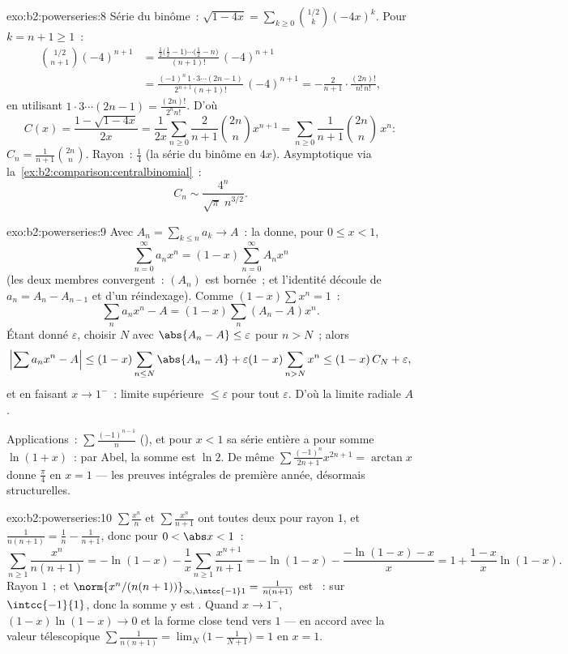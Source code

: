 \begin{solution}{exo:b2:powerseries:8}
Série du binôme~: $\sqrt{1-4x} = \sum_{k\geq0}
\binom{1/2}{k}(-4x)^k$. Pour $k = n + 1 \geq 1$~:
\begin{align*}
\binom{1/2}{n+1}(-4)^{n+1}
&= \frac{\frac12\bigl(\frac12 - 1\bigr)\cdots\bigl(\frac12 -
n\bigr)}{(n+1)!}\,(-4)^{n+1}\\
&= \frac{(-1)^n\,1\cdot3\cdots(2n-1)}{2^{n+1}(n+1)!}\,(-4)^{n+1}
= -\frac{2}{n+1}\cdot\frac{(2n)!}{n!\,n!} ,
\end{align*}
en utilisant $1\cdot3\cdots(2n-1) = \frac{(2n)!}{2^n n!}$. D'où
\[
C(x) = \frac{1 - \sqrt{1-4x}}{2x}
= \frac{1}{2x}\sum_{n\geq0}\frac{2}{n+1}\binom{2n}{n}x^{n+1}
= \sum_{n\geq0} \frac{1}{n+1}\binom{2n}{n}\,x^n :
\]
$C_n = \frac{1}{n+1}\binom{2n}{n}$. Rayon~: $\frac14$ (la série
du binôme en $4x$). Asymptotique via
la~\cref{ex:b2:comparison:centralbinomial}~:
\[
C_n \sim \frac{4^n}{\sqrt{\pi}\; n^{3/2}} .
\]
\end{solution}

\begin{solution}{exo:b2:powerseries:9}
Avec $A_n = \sum_{k \leq n} a_k \to A$~: la  donne, pour
$0 \leq x < 1$,
\[
\sum_{n=0}^{\infty} a_n x^n = (1 - x)\sum_{n=0}^{\infty} A_n x^n
\]
(les deux membres convergent~: $(A_n)$ est bornée~; et l'identité découle
de $a_n = A_n - A_{n-1}$ et d'un réindexage). Comme $(1 -
x)\sum x^n = 1$~:
\[
\sum_n a_nx^n - A = (1-x)\sum_{n} (A_n - A)x^n .
\]
Étant donné $\varepsilon$, choisir $N$ avec $\abs{A_n - A} \leq
\varepsilon$ pour $n > N$~; alors
\[
\Bigl|\sum a_nx^n - A\Bigr|
\leq (1-x)\sum_{n \leq N}\abs{A_n - A} + \varepsilon(1 -
x)\sum_{n > N}x^n
\leq (1-x)\,C_N + \varepsilon ,
\]
et en faisant $x \to 1^-$~: limite supérieure $\leq \varepsilon$ pour tout
$\varepsilon$. D'où la limite radiale $A$.

Applications~: $\sum \frac{(-1)^{n-1}}{n}$  (),
et pour $x < 1$ sa série entière a pour somme $\ln(1 + x)$~: par Abel,
la somme est $\ln 2$. De même $\sum\frac{(-1)^n}{2n+1}x^{2n+1} =
\arctan x$ donne $\frac\pi4$ en $x = 1$ --- les preuves intégrales
de première année, désormais structurelles.
\end{solution}

\begin{solution}{exo:b2:powerseries:10}
$\sum\frac{x^n}{n}$ et $\sum\frac{x^n}{n+1}$ ont toutes deux pour rayon
$1$, et $\frac{1}{n(n+1)} = \frac1n - \frac1{n+1}$, donc pour $0
< \abs x < 1$~:
\[
\sum_{n\geq1}\frac{x^n}{n(n+1)}
= -\ln(1-x) - \frac1x\sum_{n\geq1}\frac{x^{n+1}}{n+1}
= -\ln(1-x) - \frac{-\ln(1-x) - x}{x}
= 1 + \frac{1-x}{x}\ln(1-x) .
\]
Rayon $1$~; et $\norm{x^n/(n(n+1))}_{\infty,\intcc{-1}1} =
\frac{1}{n(n+1)}$ est ~:  sur
$\intcc{-1}{1}$, donc la somme y est . Quand $x \to
1^-$, $(1-x)\ln(1-x) \to 0$ et la forme close tend vers $1$ ---
en accord avec la valeur télescopique $\sum\frac{1}{n(n+1)} =
\lim_N\bigl(1 - \frac{1}{N+1}\bigr) = 1$ en $x = 1$.
\end{solution}

